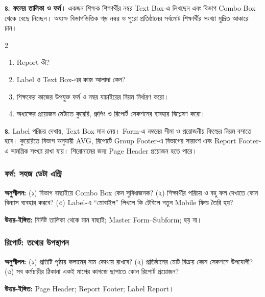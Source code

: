 \textbf{৪. ফলের তালিকা ও ফর্ম।} একজন শিক্ষক শিক্ষার্থীর নম্বর Text Box-এ লিখছেন এবং বিভাগ Combo Box থেকে বেছে নিচ্ছেন। অধ্যক্ষ বিভাগভিত্তিক গড় নম্বর ও পুরো প্রতিষ্ঠানের সর্বমোট শিক্ষার্থীর সংখ্যা মুদ্রিত আকারে চান।
\begin{multicols}{2}
\begin{enumerate}
\item[ক.] \begin{minipage}[t]{\linewidth}Report কী?
\end{minipage}
\item[খ.] \begin{minipage}[t]{\linewidth}Label ও Text Box-এর কাজ আলাদা কেন?
\end{minipage}
\item[গ.] \begin{minipage}[t]{\linewidth}শিক্ষকের কাজের উপযুক্ত ফর্ম ও নম্বর যাচাইয়ের নিয়ম নির্ধারণ করো।
\end{minipage}
\item[ঘ.] \begin{minipage}[t]{\linewidth}অধ্যক্ষের প্রয়োজন মেটাতে কুয়েরি, গ্রুপিং ও রিপোর্ট সেকশনের ব্যবহার বিশ্লেষণ করো।
\end{minipage}
\end{enumerate}
\end{multicols}



\textbf{৪.} Label পরিচয় দেখায়, Text Box মান নেয়। Form-এ নম্বরের সীমা ও প্রয়োজনীয় ফিল্ডের নিয়ম বসাতে হবে। কুয়েরিতে বিভাগ অনুযায়ী AVG, রিপোর্টে Group Footer-এ বিভাগের সারাংশ এবং Report Footer-এ সামগ্রিক সংখ্যা রাখা যায়। শিরোনামের জন্য Page Header প্রয়োজন হতে পারে।



\subsubsection{ফর্ম: সহজ ডেটা এন্ট্রি}
\textbf{অনুশীলন:} (১) বিভাগ বাছাইয়ে Combo Box কেন সুবিধাজনক? (২) শিক্ষার্থীর পরিচয় ও বহু ফল দেখাতে কোন বিন্যাস ব্যবহার করবে? (৩) Label-এ ``মোবাইল'' লিখলে কি টেবিলে নতুন Mobile ফিল্ড তৈরি হয়?\par
\textbf{উত্তর-ইঙ্গিত:} নির্দিষ্ট তালিকা থেকে মান বাছাই; Master Form--Subform; হয় না।


\subsubsection{রিপোর্ট: তথ্যের উপস্থাপন}
\textbf{অনুশীলন:} (১) প্রতিটি পৃষ্ঠায় কলামের নাম কোথায় রাখবে? (২) প্রতিষ্ঠানের মোট বিক্রয় কোন সেকশনে উপযোগী? (৩) সব কর্মচারীর ঠিকানা একই মাপের কাগজে ছাপাতে কোন রিপোর্ট প্রয়োজন?\par
\textbf{উত্তর-ইঙ্গিত:} Page Header; Report Footer; Label Report।


